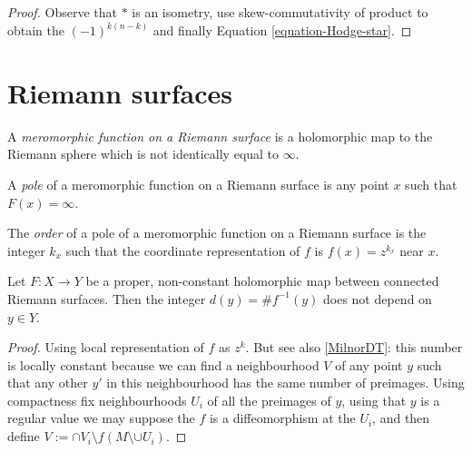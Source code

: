 \begin{proof}
Observe that $*$ is an isometry,
use skew-commutativity of product to obtain
the $(-1)^{k(n-k)}$
and finally Equation \ref{equation-Hodge-star}.
\end{proof}

\section{Riemann surfaces}
\label{section-Riemann-surfaces}

\begin{definition}
\label{definition-meromorphic-function-on-Riemann-surface}
\begin{reference}
\cite[p. 45]{Donaldson}
\end{reference}
A {\it meromorphic function on a Riemann surface} is a holomorphic map to the
Riemann sphere which is not identically equal to $\infty$.
\end{definition}

\begin{definition}
\label{definition-pole-of-meromorphic-function-on-Riemann-surface}
\begin{reference}
\cite[p. 45]{Donaldson}
\end{reference}
A {\it pole} of a meromorphic function on a Riemann surface is any point $x$ 
such that $F(x)=\infty$.
\end{definition}

\begin{definition}
\label{definition-pole-of-meromorphic-function-on-Riemann-surface}
\begin{reference}
\cite[p. 45]{Donaldson}
\end{reference}
The {\it order} of a pole of a meromorphic function on a Riemann surface is the
integer $k_x$ such that the coordinate representation of $f$ is $f(x)=z^{k_x}$
near $x$.
\end{definition}

\begin{proposition}
\label{proposition-degree-is-constant}
\begin{reference}
\cite[p. 46]{Donaldson}
\end{reference}
Let $F:X\to Y$ be a proper, non-constant holomorphic map between connected
Riemann surfaces. Then the integer $d(y)=\# f^{-1}(y)$ does not depend on $y \in
Y$.
\end{proposition}

\begin{proof}
Using local representation of $f$ as $z^k$. But see also \ref{MilnorDT}: this
number is locally constant because we can find a neighbourhood $V$ of any point 
$y$ such that any other $y'$ in this neighbourhood has the same number of
preimages. Using compactness fix neighbourhoods $U_i$ of all the preimages of 
$y$, using that $y$ is a regular value we may suppose the $f$ is a
diffeomorphism at the $U_i$, and then define 
$V:=\cap V_i\setminus f(M\setminus\cup U_i)$.
\end{proof}

